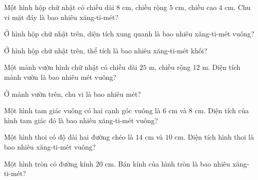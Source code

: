 \begin{ex}
  Một hình hộp chữ nhật có chiều dài $8\text{ cm}$, chiều rộng $5\text{ cm}$, chiều cao $4\text{ cm}$. Chu vi mặt đáy là bao nhiêu xăng-ti-mét?
\end{ex}

\begin{ex}
  Ở hình hộp chữ nhật trên, diện tích xung quanh là bao nhiêu xăng-ti-mét vuông?
\end{ex}

\begin{ex}
  Ở hình hộp chữ nhật trên, thể tích là bao nhiêu xăng-ti-mét khối?
\end{ex}

\begin{ex}
  Một mảnh vườn hình chữ nhật có chiều dài $25\text{ m}$, chiều rộng $12\text{ m}$. Diện tích mảnh vườn là bao nhiêu mét vuông?
\end{ex}

\begin{ex}
  Ở mảnh vườn trên, chu vi là bao nhiêu mét?
\end{ex}

\begin{ex}
  Một hình tam giác vuông có hai cạnh góc vuông là $6\text{ cm}$ và $8\text{ cm}$. Diện tích của hình tam giác đó là bao nhiêu xăng-ti-mét vuông?
\end{ex}

\begin{ex}
  Một hình thoi có độ dài hai đường chéo là $14\text{ cm}$ và $10\text{ cm}$. Diện tích hình thoi là bao nhiêu xăng-ti-mét vuông?
\end{ex}

\begin{ex}
  Một hình tròn có đường kính $20\text{ cm}$. Bán kính của hình tròn là bao nhiêu xăng-ti-mét?
\end{ex}

